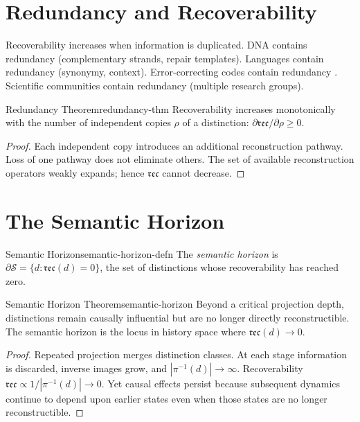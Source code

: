 \documentclass[12pt,twoside,openright]{book}
\newcommand{\reco}{\mathfrak{rec}}
\begin{document}
\section{Redundancy and Recoverability}
\label{sec:ch5-redundancy}

Recoverability increases when information is duplicated.
DNA contains redundancy (complementary strands, repair
templates). Languages contain redundancy (synonymy,
context). Error-correcting codes contain redundancy
\parencite{mackay2003}. Scientific communities contain
redundancy (multiple research groups).

\begin{theorem}{Redundancy Theorem}{redundancy-thm}
  Recoverability increases monotonically with the number
  of independent copies $\rho$ of a distinction:
  $\partial\reco/\partial\rho \ge 0$.
\end{theorem}

\begin{proof}
  Each independent copy introduces an additional
  reconstruction pathway. Loss of one pathway does not
  eliminate others. The set of available reconstruction
  operators weakly expands; hence $\reco$ cannot decrease.
\end{proof}

\section{The Semantic Horizon}
\label{sec:ch5-horizon}

\begin{definition}{Semantic Horizon}{semantic-horizon-defn}
  The \emph{semantic horizon} is
  $\partial\mathcal{S} = \{d : \reco(d) = 0\}$,
  the set of distinctions whose recoverability has
  reached zero.
\end{definition}

\begin{theorem}{Semantic Horizon Theorem}{semantic-horizon}
  Beyond a critical projection depth, distinctions remain
  causally influential but are no longer directly
  reconstructible. The semantic horizon is the locus in
  history space where $\reco(d) \to 0$.
\end{theorem}

\begin{proof}
  Repeated projection merges distinction classes.
  At each stage information is discarded, inverse images
  grow, and $|\pi^{-1}(d)| \to \infty$.
  Recoverability $\reco \propto 1/|\pi^{-1}(d)| \to 0$.
  Yet causal effects persist because subsequent dynamics
  continue to depend upon earlier states even when those
  states are no longer reconstructible.
\end{proof}
\end{document}

